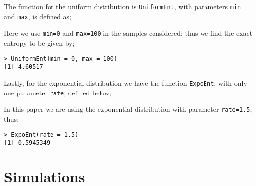 \documentclass{report}
\begin{document}
The function for the uniform distribution is \texttt{UniformEnt}, with parameters \texttt{min} and \texttt{max}, is defined as;



Here we use \texttt{min=0} and \texttt{max=100} in the samples considered; thus we find the exact entropy to be given by;

\begin{verbatim}
> UniformEnt(min = 0, max = 100)
[1] 4.60517
\end{verbatim}

Lastly, for the exponential distribution we have the function \texttt{ExpoEnt}, with only one parameter \texttt{rate}, defined below;



In this paper we are using the exponential distribution with parameter \texttt{rate=1.5}, thus;

\begin{verbatim}
> ExpoEnt(rate = 1.5)
[1] 0.5945349
\end{verbatim}

\section{Simulations}
\end{document}
